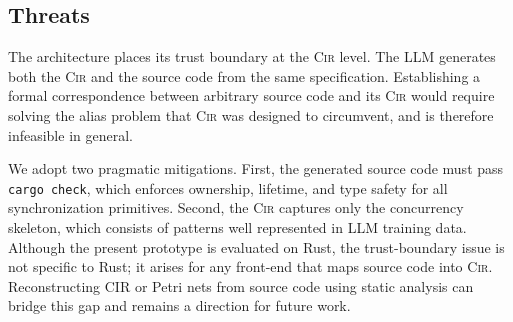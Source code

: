 \subsection{Threats}
\label{subsec:trust-boundary}

The architecture places its trust boundary at the \textsc{Cir} level. The LLM generates both the \textsc{Cir} and the source code from the same specification. Establishing a formal correspondence between arbitrary source
code and its \textsc{Cir} would require solving the alias problem that \textsc{Cir} was designed to circumvent, and is therefore infeasible in general.

We adopt two pragmatic mitigations. First, the generated source code must pass \texttt{cargo check}, which enforces ownership, lifetime, and type safety for all synchronization primitives. Second, the \textsc{Cir} captures only the concurrency skeleton, which consists of patterns well represented in LLM training data. Although the present prototype is evaluated on Rust, the trust-boundary issue is not specific to Rust; it arises for any front-end that maps source code into \textsc{Cir}. Reconstructing CIR or Petri nets from source code using static analysis can bridge this gap and remains a direction for future work.
